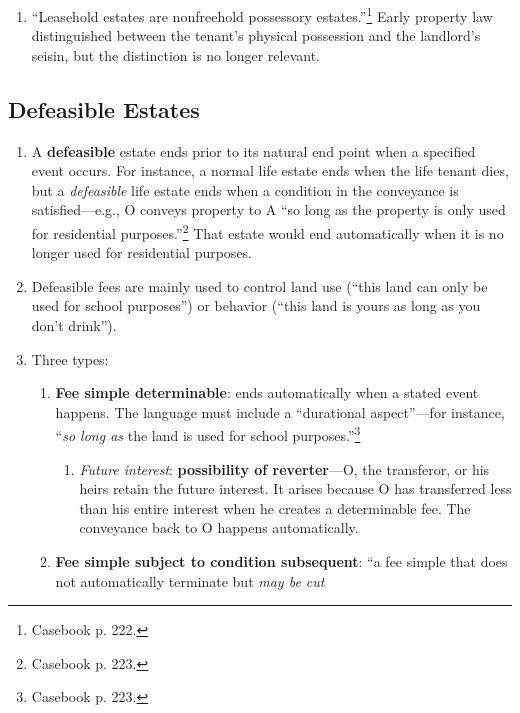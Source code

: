 \begin{enumerate}
    \item ``Leasehold estates are nonfreehold possessory 
    estates.''\footnote{Casebook p. 222.} Early property law distinguished 
    between the tenant's physical possession and the landlord's seisin, but 
    the distinction is no longer relevant.
\end{enumerate}

\subsection{Defeasible Estates}

\begin{enumerate}
    \item A \textbf{defeasible} estate ends prior to its natural end point 
    when a specified event occurs. For instance, a normal life estate ends 
    when the life tenant dies, but a \emph{defeasible} life estate ends when a 
    condition in the conveyance is satisfied---e.g., O conveys property to A 
    ``so long as the property is only used for residential 
    purposes.''\footnote{Casebook p. 223.} That estate would end automatically 
    when it is no longer used for residential purposes.
    \item Defeasible fees are mainly used to control land use (``this land can 
    only be used for school purposes'') or behavior (``this land is yours as 
    long as you don't drink'').
    \item Three types:
    \begin{enumerate}
        \item \textbf{Fee simple determinable}: ends automatically when a 
        stated event happens. The language must include a ``durational 
        aspect''---for instance, ``\emph{so long as} the land is used for 
        school purposes.''\footnote{Casebook p. 223.}
        \begin{enumerate}
            \item \emph{Future interest}: \textbf{possibility of 
            reverter}---O, the transferor, or his heirs retain the future 
            interest. It arises because O has transferred less than his entire 
            interest when he creates a determinable fee. The conveyance back 
            to O happens automatically.
        \end{enumerate}
        \item \textbf{Fee simple subject to condition subsequent}: ``a fee 
        simple that does not automatically terminate but \emph{may be cut 
}
\end{enumerate}
\end{enumerate}
